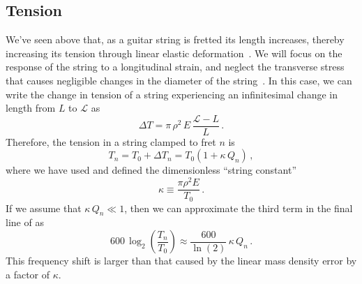 


 \subsection{Tension\label{sct:model_tension}}
We've seen above that, as a guitar string is fretted its length increases, thereby increasing its tension through linear elastic deformation~\cite{ref:landau1986toe}. We will focus on the response of the string to a longitudinal strain, and neglect the transverse stress that causes negligible changes in the diameter of the string~\cite{ref:lynchaird2017mpn}. In this case, we can write the change in tension of a string experiencing an infinitesimal change in length from $L$ to $\mathcal{L}$ as
 \begin{equation} \label{eqn:youngs_mod_def}
\Delta T = \pi\, \rho^2\, E\, \frac{\mathcal{L} - L}{L}\, .
 \end{equation}
Therefore, the tension in a string clamped to fret $n$ is
 \begin{equation} \label{eqn:t_n_def}
T_n = T_0 + \Delta T_n = T_0 \left( 1 + \kappa\, Q_n \right)\, ,
 \end{equation}
where we have used  and defined the dimensionless ``string constant''
 \begin{equation}\label{eqn:kappa_def}
\kappa \equiv \frac{\pi \rho^2 E}{T_0}\, .
 \end{equation}
If we assume that $\kappa\, Q_n \ll 1$, then we can approximate the third term in the final line of  as
 \begin{equation} \label{eqn:tension_shift}
600\, \log_2 \left(  \frac{T_n}{T_0} \right) \approx \frac{600}{\ln(2)}\, \kappa\, Q_n\, .
 \end{equation}
This frequency shift is larger than that caused by the linear mass density error by a factor of $\kappa$.

